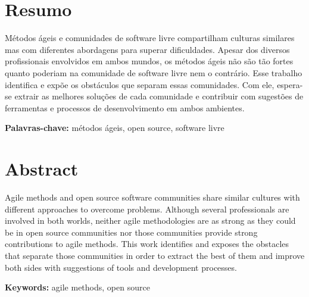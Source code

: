 \documentclass[12pt,twoside,letterpaper]{book}
\begin{document}




\chapter*{Resumo}

Métodos ágeis e comunidades de software livre compartilham culturas
similares mas com diferentes abordagens para superar
dificuldades. Apesar dos diversos profissionais envolvidos em ambos
mundos, os métodos ágeis não são tão fortes quanto poderiam na
comunidade de software livre nem o contrário. Esse trabalho identifica
e expõe os obstáculos que separam essas comunidades. Com ele,
espera-se extrair as melhores soluções de cada comunidade e contribuir
com sugestões de ferramentas e processos de desenvolvimento em ambos
ambientes.

\noindent \textbf{Palavras-chave:} métodos ágeis, open source,
software livre

\chapter*{Abstract}

Agile methods and open source software communities share similar
cultures with different approaches to overcome problems. Although
several professionals are involved in both worlds, neither agile
methodologies are as strong as they could be in open source
communities nor those communities provide strong contributions to
agile methods. This work identifies and exposes the obstacles that
separate those communities in order to extract the best of them and
improve both sides with suggestions of tools and development
processes.

\noindent \textbf{Keywords:} agile methods, open source
\end{document}
